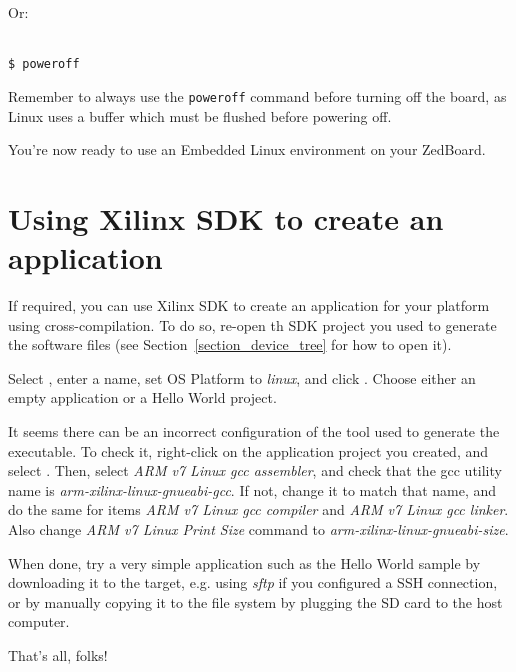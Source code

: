 \documentclass[openany,a4paper]{book}
\begin{document}
Or:

\begin{tabbing}
\kill \hspace{1cm} \= \\
\> \texttt{\$ poweroff}\\
\end{tabbing}

Remember to always use the \texttt{poweroff} command before turning off the board, as Linux uses a buffer which must be flushed before powering off.

You're now ready to use an Embedded Linux environment on your ZedBoard.

\section{Using Xilinx SDK to create an application}

If required, you can use Xilinx SDK to create an application for your platform using cross-compilation.
To do so, re-open th SDK project you used to generate the software files (see Section~\ref{section_device_tree} for how to open it).

Select , enter a name, set OS Platform to \textit{linux}, and click .
Choose either an empty application or a Hello World project.

It seems there can be an incorrect configuration of the tool used to generate the executable.
To check it, right-click on the application project you created, and select .
Then, select \textit{ARM v7 Linux gcc assembler}, and check that the gcc utility name is \textit{arm-xilinx-linux-gnueabi-gcc}.
If not, change it to match that name, and do the same for items \textit{ARM v7 Linux gcc compiler} and \textit{ARM v7 Linux gcc linker}.
Also change \textit{ARM v7 Linux Print Size} command to \textit{arm-xilinx-linux-gnueabi-size}.

When done, try a very simple application such as the Hello World sample by downloading it to the target, e.g. using \textit{sftp} if you configured a SSH connection, or by manually copying it to the file system by plugging the SD card to the host computer.

That's all, folks!
\end{document}
